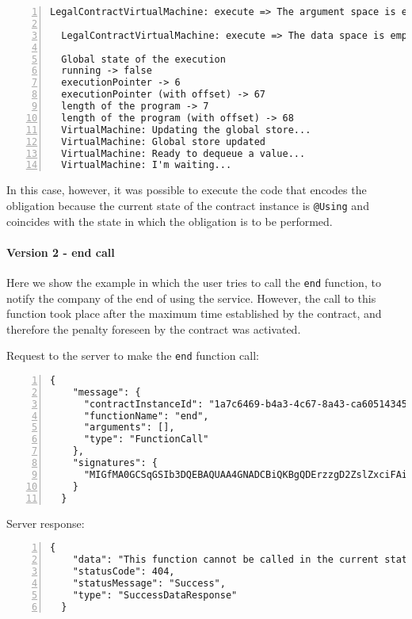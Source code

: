 \begin{Verbatim}[numbers=left,xleftmargin=1cm,firstnumber=1,breaklines=true,breakanywhere=true,tabsize=2]
  LegalContractVirtualMachine: execute => The argument space is empty

  LegalContractVirtualMachine: execute => The data space is empty

  Global state of the execution
  running -> false
  executionPointer -> 6
  executionPointer (with offset) -> 67
  length of the program -> 7
  length of the program (with offset) -> 68
  VirtualMachine: Updating the global store...
  VirtualMachine: Global store updated
  VirtualMachine: Ready to dequeue a value...
  VirtualMachine: I'm waiting...
\end{Verbatim}

In this case, however, it was possible to execute the code that encodes the obligation because the current 
state of the contract instance is \verb|@Using| and coincides with the state in which the obligation is to 
be performed.

\newpage
\paragraph{Version 2 - end call}

Here we show the example in which the user tries to call the \verb|end| function, to notify the company 
of the end of using the service. However, the call to this function took place after the maximum time 
established by the contract, and therefore the penalty foreseen by the contract was activated.

Request to the server to make the \verb|end| function call:
\begin{Verbatim}[numbers=left,xleftmargin=1cm,firstnumber=1,breaklines=true,breakanywhere=true,tabsize=2]
  {
    "message": {
      "contractInstanceId": "1a7c6469-b4a3-4c67-8a43-ca60514345f6",
      "functionName": "end",
      "arguments": [],
      "type": "FunctionCall"
    },
    "signatures": {
      "MIGfMA0GCSqGSIb3DQEBAQUAA4GNADCBiQKBgQDErzzgD2ZslZxciFAiX3/ot7lrkZDw4148jFZrsDZPE6CVs9xXFSHGgy/mFvIFLXhnChO6Nyd2be3lbgeavLMCMVUiTStXr117Km17keWpb3sItkKKsLFBOcIIU8XXowI/OhzQN2XPZYESHgjdQ5vwEj2YyueiS7WKP94YWz/pswIDAQAB": "Ow8gS8d5SChD3E5CgtsnFHTRWskdeWW2IsTLQJk92mS40LfVtPcxuDiIbzL7xWwtUTMFxza+/TSxU+rMsVvMqQLLyUQ4e6UrLO25+Nr7p5x013JGIaxc18G5kqEuS4iEyiqN1479E4ElLROE+VpI5DBAKMegw0h9m5cbtHFN/fA="
    }
  }
\end{Verbatim}

Server response:
\begin{Verbatim}[numbers=left,xleftmargin=1cm,firstnumber=1,breaklines=true,breakanywhere=true,tabsize=2]
  {
    "data": "This function cannot be called in the current state",
    "statusCode": 404,
    "statusMessage": "Success",
    "type": "SuccessDataResponse"
  }
\end{Verbatim}

